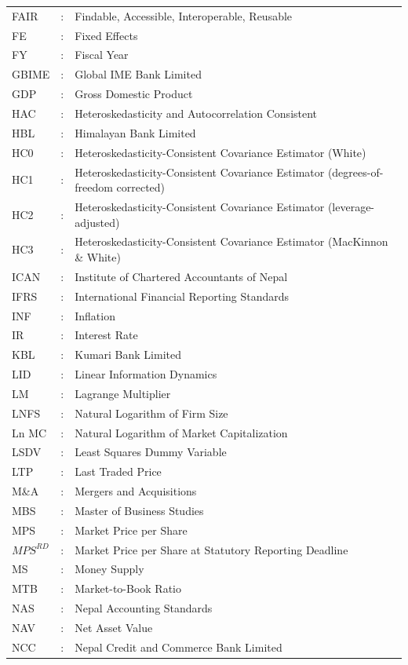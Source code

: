 \begin{longtable}{@{}>{\setstretch{1.4276}}p{60pt}>{\setstretch{1.4276}}p{24pt}>{\setstretch{1.4276}}p{\dimexpr\textwidth-108pt\relax}@{}}
FAIR & : & Findable, Accessible, Interoperable, Reusable \\
FE & : & Fixed Effects \\
FY & : & Fiscal Year \\
GBIME & : & Global IME Bank Limited \\
GDP & : & Gross Domestic Product \\
HAC & : & Heteroskedasticity and Autocorrelation Consistent \\
HBL & : & Himalayan Bank Limited \\
HC0 & : & Heteroskedasticity-Consistent Covariance Estimator (White) \\
HC1 & : & Heteroskedasticity-Consistent Covariance Estimator (degrees-of-freedom corrected) \\
HC2 & : & Heteroskedasticity-Consistent Covariance Estimator (leverage-adjusted) \\
HC3 & : & Heteroskedasticity-Consistent Covariance Estimator (MacKinnon \& White) \\
ICAN & : & Institute of Chartered Accountants of Nepal \\
IFRS & : & International Financial Reporting Standards \\
INF & : & Inflation \\
IR & : & Interest Rate \\
KBL & : & Kumari Bank Limited \\
LID & : & Linear Information Dynamics \\
LM & : & Lagrange Multiplier \\
LNFS & : & Natural Logarithm of Firm Size \\
Ln MC & : & Natural Logarithm of Market Capitalization \\
LSDV & : & Least Squares Dummy Variable \\
LTP & : & Last Traded Price \\
M\&A & : & Mergers and Acquisitions \\
MBS & : & Master of Business Studies \\
MPS & : & Market Price per Share \\
$\mathit{MPS}^{RD}$ & : & Market Price per Share at Statutory Reporting Deadline \\
MS & : & Money Supply \\
MTB & : & Market-to-Book Ratio \\
NAS & : & Nepal Accounting Standards \\
NAV & : & Net Asset Value \\
NCC & : & Nepal Credit and Commerce Bank Limited \\

\end{longtable}
